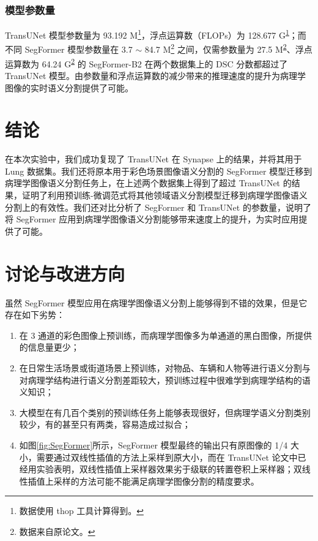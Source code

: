 \documentclass[hyperref,a4paper,UTF8]{ctexart}
\begin{document}
\subsubsection{模型参数量}

TransUNet 模型参数量为 93.192 M\footnote{数据使用 thop 工具计算得到。\label{foot:thop}}，浮点运算数（FLOPs）为 128.677 G\textsuperscript{\ref{foot:thop}}；而不同 SegFormer 模型参数量在 3.7 $\sim$ 84.7 M\footnote{数据来自原论文\cite{ref2}。\label{foot:数据来自原论文}} 之间，仅需参数量为 27.5 M\textsuperscript{\ref{foot:数据来自原论文}}、浮点运算数为 64.24 G\textsuperscript{\ref{foot:数据来自原论文}} 的 SegFormer-B2 在两个数据集上的 DSC 分数都超过了 TransUNet 模型。由参数量和浮点运算数的减少带来的推理速度的提升为病理学图像的实时语义分割提供了可能。

\section{结论}

在本次实验中，我们成功复现了 TransUNet 在 Synapse 上的结果，并将其用于 Lung 数据集。我们还将原本用于彩色场景图像语义分割的 SegFormer 模型迁移到病理学图像语义分割任务上，在上述两个数据集上得到了超过 TransUNet 的结果，证明了利用预训练-微调范式将其他领域语义分割模型迁移到病理学图像语义分割上的有效性。我们还对比分析了 SegFormer 和 TransUNet 的参数量，说明了将 SegFormer 应用到病理学图像语义分割能够带来速度上的提升，为实时应用提供了可能。

\section{讨论与改进方向}

虽然 SegFormer 模型应用在病理学图像语义分割上能够得到不错的效果，但是它存在如下劣势：

\begin{enumerate}[itemsep=2pt,topsep=0pt,parsep=0pt]
    \item 在 3 通道的彩色图像上预训练，而病理学图像多为单通道的黑白图像，所提供的信息量更少；
    \item 在日常生活场景或街道场景上预训练，对物品、车辆和人物等进行语义分割与对病理学结构进行语义分割差距较大，预训练过程中很难学到病理学结构的语义知识；
    \item 大模型在有几百个类别的预训练任务上能够表现很好，但病理学语义分割类别较少，有的甚至只有两类，容易造成过拟合；
    \item 如图\ref{fig:SegFormer}所示，SegFormer 模型最终的输出只有原图像的 1/4 大小，需要通过双线性插值的方法上采样到原大小，而在 TransUNet 论文\cite{ref1}中已经用实验表明，双线性插值上采样器效果劣于级联的转置卷积上采样器；双线性插值上采样的方法可能不能满足病理学图像分割的精度要求。
\end{enumerate}
\end{document}

